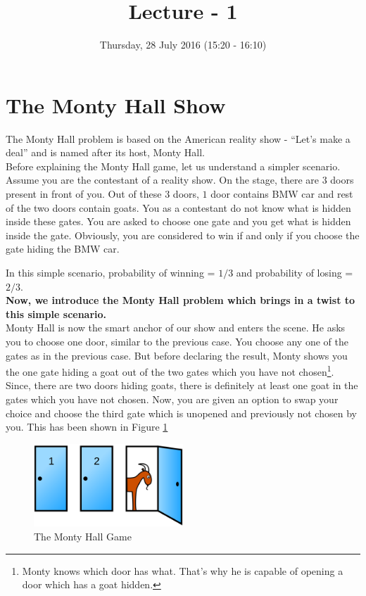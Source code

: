 \documentclass{llncs}
\title{Lecture - 1}
\author{Thursday, 28 July 2016 (15:20 - 16:10)}
\institute{Puzzles : Monty Hall Show, Coin Tossing Game}
\begin{document}
\maketitle
\section{The Monty Hall Show}

The Monty Hall problem is based on the American reality show - ``Let's make a deal'' and is named after its host, Monty Hall. \\

Before explaining the Monty Hall game, let us understand a simpler scenario. Assume you are the contestant of a reality show. On the stage, there are $3$ doors present in front of you. Out of these $3$ doors, $1$ door contains BMW car and rest of the two doors contain goats. You as a contestant do not know what is hidden inside these gates. You are asked to choose one gate and you get what is hidden inside the gate. Obviously, you are considered to win if and only if you choose the gate hiding the BMW car.  

In this simple scenario, probability of winning = $1/3$ and probability of losing = $2/3$.\\

\textbf{Now, we introduce the Monty Hall problem which brings in a twist to this simple scenario.}\\

Monty Hall is now the smart anchor of our show and enters the scene. He asks you to choose one door, similar to the previous case. You choose any one of the gates as in the previous case. But before declaring the result, Monty shows you the one gate hiding a goat out of the two gates which you have not chosen\footnote{Monty knows which door has what. That's why he is capable of opening a door which has a goat hidden.}. Since, there are two doors hiding goats, there is definitely at least one goat in the gates which you have not chosen. Now, you are given an option to swap your choice and choose the third gate which is unopened and previously not chosen by you. This has been shown in Figure \ref{monty} \\

\begin{figure}[h]
\centering
\includegraphics[width=0.5\textwidth]{monty.png}
\caption{The Monty Hall Game}
\label{monty}
\end{figure}
\end{document}
